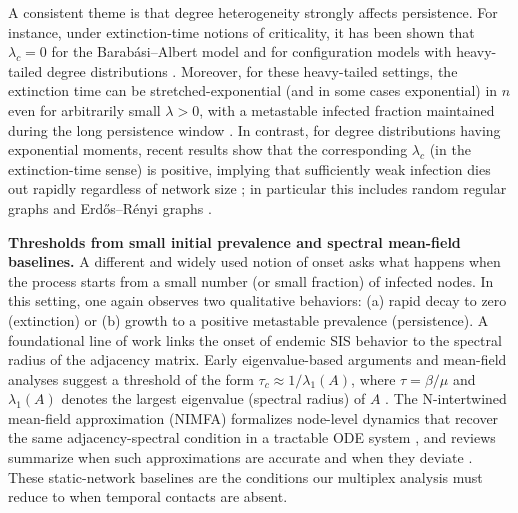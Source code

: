 \documentclass[pdflatex,sn-mathphys-num]{sn-jnl}%
\theoremstyle{thmstyleone}%
\theoremstyle{thmstyletwo}%
\theoremstyle{thmstylethree}%
\begin{document}
A consistent theme is that degree heterogeneity strongly affects persistence.
For instance, under extinction-time notions of criticality, it has been shown that $\lambda_c=0$ for the Barab\'asi--Albert model \cite{berger2005spread} and for configuration models with heavy-tailed degree distributions \cite{ChatterjeeDurrett2009}.
Moreover, for these heavy-tailed settings, the extinction time can be stretched-exponential (and in some cases exponential) in $n$ even for arbitrarily small $\lambda>0$, with a metastable infected fraction maintained during the long persistence window \cite{Mountford2013,mountford2016exponential}.
In contrast, for degree distributions having exponential moments, recent results show that the corresponding $\lambda_c$ (in the extinction-time sense) is positive, implying that sufficiently weak infection dies out rapidly regardless of network size \cite{bhamidi2021survival}; in particular this includes random regular graphs and Erd\H{o}s--R\'enyi graphs \cite{mourrat2016phase,cator2021explicit,nam2022critical}.

\textbf{Thresholds from small initial prevalence and spectral mean-field baselines.}
A different and widely used notion of onset asks what happens when the process starts from a small number (or small fraction) of infected nodes.
In this setting, one again observes two qualitative behaviors: (a) rapid decay to zero (extinction) or (b) growth to a positive metastable prevalence (persistence).
A foundational line of work links the onset of endemic SIS behavior to the spectral radius of the adjacency matrix.
Early eigenvalue-based arguments and mean-field analyses suggest a threshold of the form $\tau_c \approx 1/\lambda_1(A)$, where $\tau=\beta/\mu$ and $\lambda_1(A)$ denotes the largest eigenvalue (spectral radius) of $A$ \cite{PastorSatorras2001,Wang2003}.
The N-intertwined mean-field approximation (NIMFA) formalizes node-level dynamics that recover the same adjacency-spectral condition in a tractable ODE system \cite{VanMieghem2009}, and reviews summarize when such approximations are accurate and when they deviate \cite{PSV2015}.
These static-network baselines are the conditions our multiplex analysis must reduce to when temporal contacts are absent.
\end{document}
